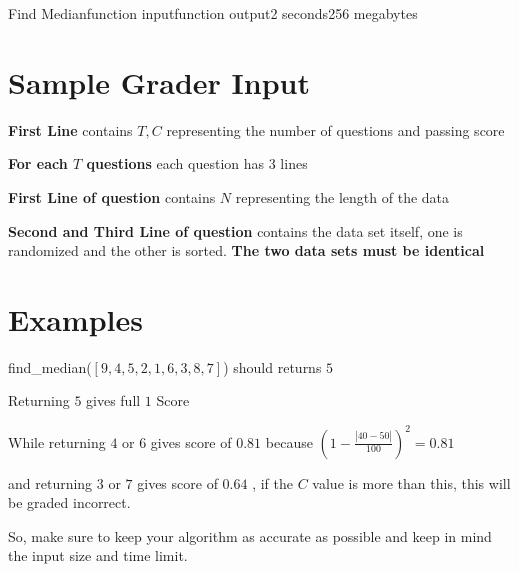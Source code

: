 \documentclass[11pt,a4paper]{article}
\begin{document}
\begin{problem}{Find Median}{function input}{function output}{2 seconds}{256 megabytes}
\section*{Sample Grader Input}

\textbf{First Line} contains $T, C$ representing the number of questions and passing score

\textbf{For each $T$ questions} each question has $3$ lines

\textbf{First Line of question} contains $N$ representing the length of the data

\textbf{Second and Third Line of question} contains the data set itself, one is randomized and the other is sorted. \textbf{The two data sets must be identical}

\section*{Examples}

find\_median($[9,4,5,2,1,6,3,8,7]$) should returns $5$

Returning $5$ gives full $1$ Score

While returning $4$ or $6$ gives score of $0.81$ because $(1 - \frac{|40-50|}{100})^2 = 0.81$

and returning $3$ or $7$ gives score of $0.64$ , if the $C$ value is more than this, this will be graded incorrect.

So, make sure to keep your algorithm as accurate as possible and keep in mind the input size and time limit.

\end{problem}
\end{document}
